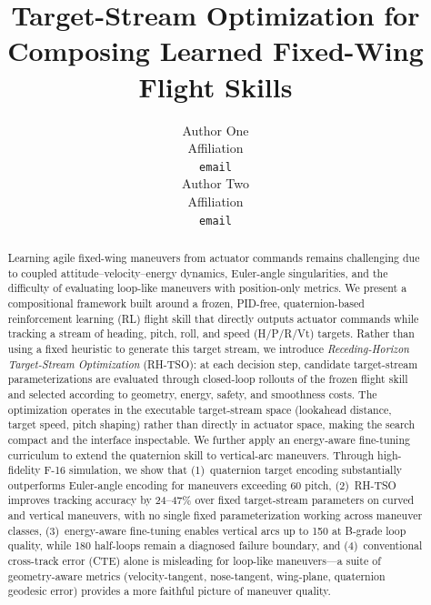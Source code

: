 \documentclass{article}
\title{Target-Stream Optimization for Composing Learned Fixed-Wing Flight Skills}
\author{
  Author One\\
  Affiliation\\
  \texttt{email} \\
  \And
  Author Two\\
  Affiliation\\
  \texttt{email} \\
}
\begin{document}
\maketitle


\begin{abstract}
  Learning agile fixed-wing maneuvers from actuator commands remains challenging due to coupled attitude--velocity--energy dynamics, Euler-angle singularities, and the difficulty of evaluating loop-like maneuvers with position-only metrics.
  We present a compositional framework built around a frozen, PID-free, quaternion-based reinforcement learning (RL) flight skill that directly outputs actuator commands while tracking a stream of heading, pitch, roll, and speed (H/P/R/Vt) targets.
  Rather than using a fixed heuristic to generate this target stream, we introduce \emph{Receding-Horizon Target-Stream Optimization} (RH-TSO): at each decision step, candidate target-stream parameterizations are evaluated through closed-loop rollouts of the frozen flight skill and selected according to geometry, energy, safety, and smoothness costs.
  The optimization operates in the executable target-stream space (lookahead distance, target speed, pitch shaping) rather than directly in actuator space, making the search compact and the interface inspectable.
  We further apply an energy-aware fine-tuning curriculum to extend the quaternion skill to vertical-arc maneuvers.
  Through high-fidelity F-16 simulation, we show that (1)~quaternion target encoding substantially outperforms Euler-angle encoding for maneuvers exceeding 60\textdegree{} pitch, (2)~RH-TSO improves tracking accuracy by 24--47\% over fixed target-stream parameters on curved and vertical maneuvers, with no single fixed parameterization working across maneuver classes, (3)~energy-aware fine-tuning enables vertical arcs up to 150\textdegree{} at B-grade loop quality, while 180\textdegree{} half-loops remain a diagnosed failure boundary, and (4)~conventional cross-track error (CTE) alone is misleading for loop-like maneuvers---a suite of geometry-aware metrics (velocity-tangent, nose-tangent, wing-plane, quaternion geodesic error) provides a more faithful picture of maneuver quality.
\end{abstract}

\end{document}
